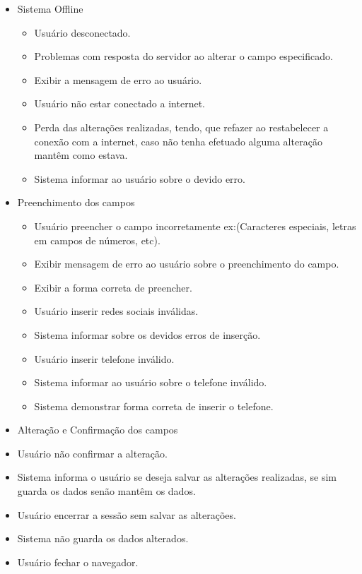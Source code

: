 {
\begin{itemize}
	\item Sistema Offline
	   \begin{itemize}	
		\item Usuário desconectado.
		\item Problemas com resposta do servidor ao alterar o campo especificado.
		\item Exibir a mensagem de erro ao usuário.
		\item Usuário não estar conectado a internet.
		\item Perda das alterações realizadas, tendo, que refazer ao restabelecer a conexão com a internet, caso não tenha efetuado alguma alteração mantêm como estava.
		\item Sistema informar ao usuário sobre o devido erro.
     	    \end{itemize}
	\item Preenchimento dos campos    
	    \begin{itemize}
		\item Usuário preencher o campo incorretamente ex:(Caracteres especiais, letras em campos de números, etc).
		\item Exibir mensagem de erro ao usuário sobre o preenchimento do campo.
		\item Exibir a forma correta de preencher.
		\item Usuário inserir redes sociais inválidas.
		\item Sistema informar sobre os devidos erros de inserção.
		\item Usuário inserir telefone inválido.
		\item Sistema informar ao usuário sobre o telefone inválido.
		\item Sistema demonstrar forma correta de inserir o telefone.
	     \end{itemize}
	\item Alteração e Confirmação dos campos     
		\item Usuário não confirmar a alteração.
		\item Sistema informa o usuário se deseja salvar as alterações realizadas, se sim guarda os dados senão mantêm os dados.
		\item Usuário encerrar a sessão sem salvar as alterações.
		\item Sistema não guarda os dados alterados.
		\item Usuário fechar o navegador.
\end{itemize}
}
